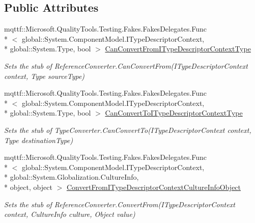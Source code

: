 \subsection*{Public Attributes}
\begin{DoxyCompactItemize}
\item 
mqttf\-::\-Microsoft.\-Quality\-Tools.\-Testing.\-Fakes.\-Fakes\-Delegates.\-Func\\*
$<$ global\-::\-System.\-Component\-Model.\-I\-Type\-Descriptor\-Context, \\*
global\-::\-System.\-Type, bool $>$ \hyperlink{class_system_1_1_component_model_1_1_fakes_1_1_stub_component_converter_a8c586801ea9baab20dd141843a03295d}{Can\-Convert\-From\-I\-Type\-Descriptor\-Context\-Type}
\begin{DoxyCompactList}\small\item\em Sets the stub of Reference\-Converter.\-Can\-Convert\-From(\-I\-Type\-Descriptor\-Context context, Type source\-Type)\end{DoxyCompactList}\item 
mqttf\-::\-Microsoft.\-Quality\-Tools.\-Testing.\-Fakes.\-Fakes\-Delegates.\-Func\\*
$<$ global\-::\-System.\-Component\-Model.\-I\-Type\-Descriptor\-Context, \\*
global\-::\-System.\-Type, bool $>$ \hyperlink{class_system_1_1_component_model_1_1_fakes_1_1_stub_component_converter_a55169fcd890409ab72d52d56fff39c34}{Can\-Convert\-To\-I\-Type\-Descriptor\-Context\-Type}
\begin{DoxyCompactList}\small\item\em Sets the stub of Type\-Converter.\-Can\-Convert\-To(\-I\-Type\-Descriptor\-Context context, Type destination\-Type)\end{DoxyCompactList}\item 
mqttf\-::\-Microsoft.\-Quality\-Tools.\-Testing.\-Fakes.\-Fakes\-Delegates.\-Func\\*
$<$ global\-::\-System.\-Component\-Model.\-I\-Type\-Descriptor\-Context, \\*
global\-::\-System.\-Globalization.\-Culture\-Info, \\*
object, object $>$ \hyperlink{class_system_1_1_component_model_1_1_fakes_1_1_stub_component_converter_a99bc66bd0a84e78e801b95b2952d9614}{Convert\-From\-I\-Type\-Descriptor\-Context\-Culture\-Info\-Object}
\begin{DoxyCompactList}\small\item\em Sets the stub of Reference\-Converter.\-Convert\-From(\-I\-Type\-Descriptor\-Context context, Culture\-Info culture, Object value)\end{DoxyCompactList}\item 

\end{DoxyCompactItemize}
